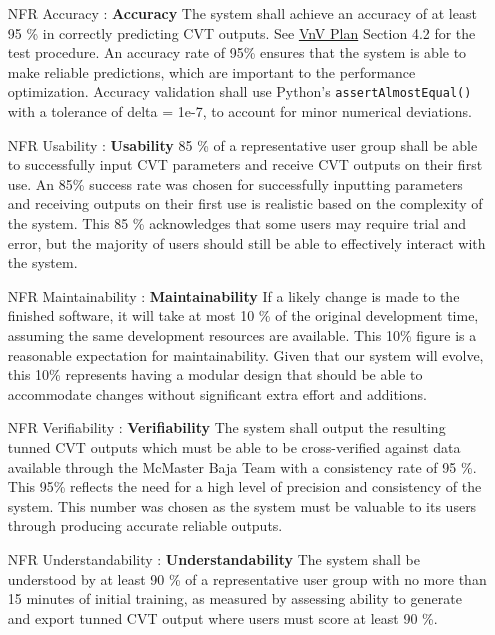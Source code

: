 \documentclass[12pt]{article}
\begin{document}
\noindent \begin{itemize}

\item[NFR Accuracy \label{NFR:AC}:]\textbf{Accuracy} The system shall achieve an accuracy of at least 95 \% in correctly predicting CVT outputs. 
See \href{https://github.com/gr812b/CVT-Simulator/blob/main/docs/VnVPlan/VnVPlan.pdf}{VnV Plan} Section 4.2 for the test procedure. An accuracy rate of 95\% ensures that the system is able to make reliable predictions, which are important to the performance optimization. 
Accuracy validation shall use Python’s \texttt{assertAlmostEqual()} with a tolerance of delta = 1e-7, to account for minor numerical deviations.
\item[NFR Usability \label{NFR:US}:] \textbf{Usability} 85 \% of a representative user group shall be able to successfully input CVT parameters and receive CVT outputs on their first use.
An 85\% success rate was chosen for successfully inputting parameters and receiving outputs on their first use is realistic based on the complexity of the system. 
This 85 \% acknowledges that some users may require trial and error, but the majority of users should still be able to effectively interact with the system. 
\item[NFR Maintainability \label{NFR:MA}:]\textbf{Maintainability} If a likely change is made to the finished software, it will take at most 10 \% of the original development time, assuming the same development resources are available.
This 10\% figure is a reasonable expectation for maintainability. 
Given that our system will evolve, this 10\% represents having a modular design that should be able to accommodate changes without significant extra effort and additions. 
\item[NFR Verifiability \label{NFR:VE}:] \textbf{Verifiability} The system shall output the resulting tunned CVT outputs which must be able to be cross-verified against data available through the McMaster Baja Team with a consistency rate of 95 \%.
This 95\% reflects the need for a high level of precision and consistency of the system. 
This number was chosen as the system must be valuable to its users through producing accurate reliable outputs. 
\item[NFR Understandability \label{NFR:UN}:] \textbf{Understandability} The system shall be understood by at least 90 \% of a representative user group with no more than 15 minutes of initial training, as measured by assessing ability to generate and export tunned CVT output where users must score at least 90 \%.

\end{itemize}
\end{document}
